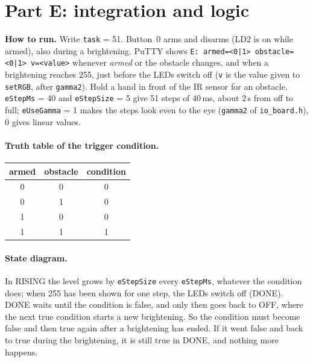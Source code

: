 \documentclass[11pt,a4paper]{article}
\newcommand{\lv}[1]{\texttt{#1}}                 %
\newcommand{\run}[1]{\textbf{How to run.} #1}
\begin{document}
\section{Part E: integration and logic}
\run{Write \lv{task} = 51. Button~0
arms and disarms (LD2 is on while armed), also during a brightening. PuTTY shows \texttt{E: armed=<0|1>
obstacle=<0|1> v=<value>} whenever \emph{armed} or the obstacle changes, and when a brightening reaches 255, just
before the LEDs switch off (\texttt{v} is the value given to \texttt{setRGB}, after \texttt{gamma2}). Hold a hand in
front of the IR sensor for an obstacle. \lv{eStepMs} = 40 and \lv{eStepSize} = 5 give 51 steps of 40\,ms, about 2\,s
from off to full; \lv{eUseGamma} = 1 makes the steps look even to the eye (\texttt{gamma2} of \texttt{io\_board.h}),
0 gives linear values.}

\paragraph{Truth table of the trigger condition.}
\begin{center}
\begin{tabular}{c c c}
\toprule
armed & obstacle & condition \\
\midrule
0 & 0 & 0 \\
0 & 1 & 0 \\
1 & 0 & 0 \\
1 & 1 & 1 \\
\bottomrule
\end{tabular}
\end{center}

\paragraph{State diagram.}
\begin{center}
\end{center}
In RISING the level grows by \lv{eStepSize} every \lv{eStepMs}, whatever the condition does; when 255 has been shown
for one step, the LEDs switch off (DONE). DONE waits until the condition is false, and only then goes back to OFF, where
the next true condition starts a new brightening. So the condition must become false and then true again after a
brightening has ended. If it went false and back to true during the brightening, it is still true in DONE, and nothing
more happens.
\end{document}
